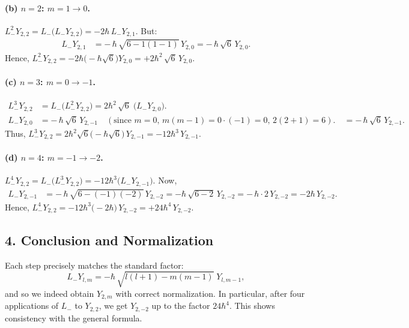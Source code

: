 \documentclass[12pt]{article}
\begin{document}
\paragraph{(b) $n=2$: $m=1\to0$.}
\(
L_{-}^2 Y_{2,2} = L_{-}\bigl(L_{-}Y_{2,2}\bigr) = -2\hbar\,L_{-}Y_{2,1}.
\)
But:
\begin{align*}
L_{-}Y_{2,1} &= -\,\hbar\,\sqrt{6 - 1(1-1)}\,Y_{2,0}
= -\,\hbar\,\sqrt{6}\,Y_{2,0}.
\end{align*}
Hence,
\(
L_{-}^2 Y_{2,2} = -2\hbar\bigl( -\hbar\sqrt{6}\bigr)Y_{2,0} = +2\hbar^2\,\sqrt{6}\,Y_{2,0}.
\)

\paragraph{(c) $n=3$: $m=0\to-1$.}
\begin{align*}
L_{-}^3 Y_{2,2} &= L_{-}\bigl(L_{-}^2 Y_{2,2}\bigr)
= 2\hbar^2\,\sqrt{6}\;\bigl(L_{-}Y_{2,0}\bigr).\\
L_{-}Y_{2,0} &= -\,\hbar\,\sqrt{6}\,Y_{2,-1}\quad(\text{since }m=0,\,m(m-1)=0\cdot(-1)=0,\,2(2+1)=6).\
&= -\,\hbar\,\sqrt{6}\,Y_{2,-1}.
\end{align*}
Thus,
\(
L_{-}^3 Y_{2,2} = 2\hbar^2\sqrt{6}\bigl(-\hbar\sqrt{6}\bigr)\,Y_{2,-1} = -12\hbar^3\,Y_{2,-1}.
\)

\paragraph{(d) $n=4$: $m=-1\to-2$.}
\(
L_{-}^4 Y_{2,2} = L_{-}\bigl(L_{-}^3 Y_{2,2}\bigr)
= -12\hbar^3\bigl(L_{-}Y_{2,-1}\bigr).
\)
Now,
\begin{align*}
L_{-}Y_{2,-1} &= -\,\hbar\,\sqrt{6 - (-1)(-2)}\,Y_{2,-2}
= -\hbar\,\sqrt{6-2}\,Y_{2,-2}
= -\,\hbar\cdot 2\,Y_{2,-2}
= -2\hbar\,Y_{2,-2}.
\end{align*}
Hence,
\(
L_{-}^4 Y_{2,2} = -12\hbar^3\bigl(-2\hbar\bigr)\,Y_{2,-2} = +24\hbar^4\,Y_{2,-2}.
\)

\subsection*{4. Conclusion and Normalization}
Each step precisely matches the standard factor:
\[
L_{-}Y_{l,m} = -\hbar\,\sqrt{l(l+1)-m(m-1)}\;Y_{l,m-1},
\]
and so we indeed obtain \(Y_{2,m}\) with correct normalization. In particular, after four applications of \(L_{-}\) to \(Y_{2,2}\), we get \(Y_{2,-2}\) up to the factor \(24\hbar^4\). This shows consistency with the general formula.
\end{document}
